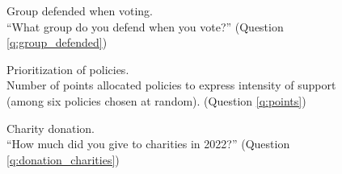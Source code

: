 \documentclass[12pt,english]{article}
\begin{document}
\begin{figure}[h!]
    \caption[Group defended when voting]{Group defended when voting. \\ ``What group do you defend when you vote?'' (Question \ref{q:group_defended})}\label{fig:group_defended}
\end{figure}

\begin{figure}[h!] %
    \caption[Prioritization of policies]{Prioritization of policies. \\Number of points allocated policies to express intensity of support (among six policies chosen at random). (Question \ref{q:points})}\label{fig:points}
\end{figure}

\begin{figure}[h!] 
    \caption[Charity donation]{Charity donation. \\ ``How much did you give to charities in 2022?'' (Question \ref{q:donation_charities})}\label{fig:donation_charities}
\end{figure}
\end{document}
